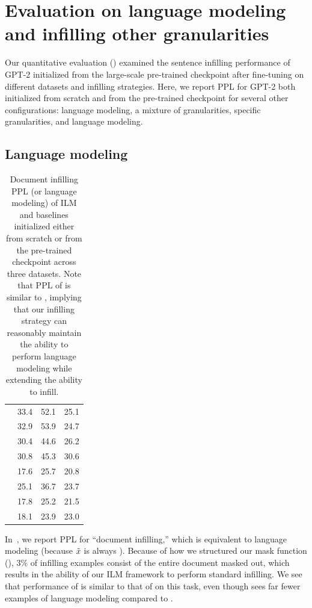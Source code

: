 \section{Evaluation on language modeling and infilling other granularities}\label{sec:eval_granularities}

Our quantitative evaluation () examined the sentence infilling performance of GPT-2 initialized from the large-scale pre-trained checkpoint after fine-tuning on different datasets and infilling strategies. 
Here, we report PPL for GPT-2 both initialized from scratch and from the pre-trained checkpoint for several other configurations: language modeling, a mixture of granularities, specific granularities, and language modeling.

\subsection{Language modeling}\label{sec:quant_lm}

\begin{table}[t]
    \centering
    \begin{tabular}[t]{lccc}
        \toprule
            & \sto{}   & \abs{}   & \lyr{} \\
        \midrule
\lmscratch{} & 33.4 & 52.1 & 25.1 \\
\lmrevscratch{} & 32.9 & 53.9 & 24.7 \\
\lmallscratch{} & 30.4 & 44.6 & 26.2 \\
\ilmscratch{} & 30.8 & 45.3 & 30.6 \\
\lm{} & 17.6 & 25.7 & 20.8 \\
\lmrev{} & 25.1 & 36.7 & 23.7 \\
\lmall{} & 17.8 & 25.2 & 21.5 \\
\ilm{} & 18.1 & 23.9 & 23.0 \\
        \bottomrule
    \end{tabular}
    \caption{Document infilling PPL (or language modeling) of ILM and baselines initialized either from scratch or from the pre-trained checkpoint across three datasets. Note that PPL of \ilm{} is similar to \lm{}, implying that our infilling strategy can reasonably maintain the ability to perform language modeling while extending the ability to infill.}
    \label{tab:granu_ppl_documents}
\end{table}

In~, we report PPL for ``document infilling,'' which is equivalent to language modeling (because $\tilde{x}$ is always \blankdocument{}). 
Because of how we structured our mask function (), 
$3$\% of infilling examples consist of the entire document masked out, 
which results in the ability of our ILM framework to perform standard infilling. 
We see that performance of \ilm{} is similar to that of \lm{} on this task, even though \ilm{} sees far fewer examples of language modeling compared to \lm{}.

